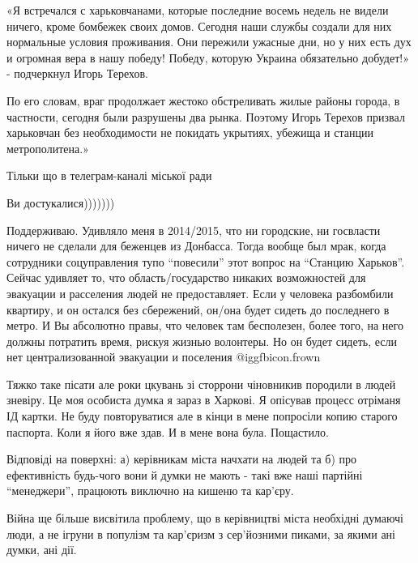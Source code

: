\begin{itemize}
«Я встречался с харьковчанами, которые последние восемь недель не видели
ничего, кроме бомбежек своих домов. Сегодня наши службы создали для них
нормальные условия проживания. Они пережили ужасные дни, но у них есть дух и
огромная вера в нашу победу! Победу, которую Украина обязательно добудет!» -
подчеркнул Игорь Терехов.

По его словам, враг продолжает жестоко обстреливать жилые районы города, в
частности, сегодня были разрушены два рынка. Поэтому Игорь Терехов призвал
харьковчан без необходимости не покидать укрытиях, убежища и станции
метрополитена.»

Тільки що в телеграм-каналі міської ради

Ви достукалися)))))))


Поддерживаю. Удивляло меня в 2014/2015, что ни городские, ни госвласти ничего
не сделали для беженцев из Донбасса. Тогда вообще был мрак, когда сотрудники
соцуправления тупо \enquote{повесили} этот вопрос на \enquote{Станцию Харьков}. Сейчас удивляет
то, что область/государство никаких возможностей для эвакуации и расселения
людей не предоставляет. Если у человека разбомбили квартиру, и он остался без
сбережений, он/она будет сидеть до последнего в метро. И Вы абсолютно правы,
что человек там бесполезен, более того, на него должны потратить время, рискуя
жизнью волонтеры. Но он будет сидеть, если нет централизованной эвакуации и
поселения  @igg{fbicon.frown} 


Тяжко таке пісати але роки цкувань зі сторрони чіновникив породили в людей
зневіру. Це моя особиста думка я зараз в Харкові. Я опісував процесс отріманя
ІД картки. Не буду повторуватися але в кінци в мене попросіли копию старого
паспорта. Коли я його вже здав. И в мене вона була. Пощастило.


Відповіді на поверхні: а) керівникам міста начхати на людей та б) про
ефективність будь-чого вони й думки не мають - такі вже наші партійні
\enquote{менеджери}, працюють виключно на кишеню та кар'єру.

Війна ще більше висвітила проблему, що в керівництві міста необхідні думаючі
люди, а не ігруни в популізм та кар'єризм з сер'йозними пиками, за якими ані
думки, ані дії.



\end{itemize} %
